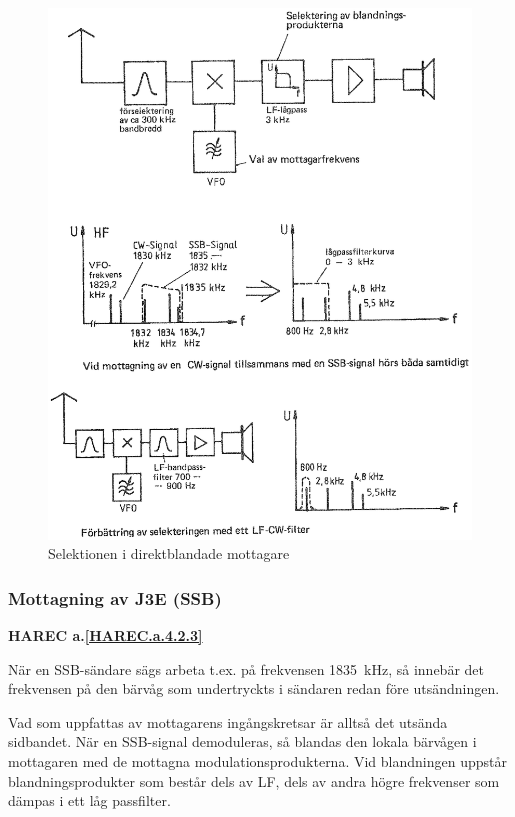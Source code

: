 \begin{figure}
  \includegraphics[width=\textwidth]{images/cropped_pdfs/bild_2_4-11.pdf}
  \caption{Selektionen i direktblandade mottagare}
  \label{fig:bildII4-11}
\end{figure}

\subsubsection{Mottagning av J3E (SSB)}
\textbf{HAREC a.\ref{HAREC.a.4.2.3}\label{myHAREC.a.4.2.3}}

När en SSB-sändare sägs arbeta t.ex. på frekvensen 1835~kHz, så
innebär det frekvensen på den bärvåg som undertryckts i sändaren redan
före utsändningen.

Vad som uppfattas av mottagarens ingångskretsar är alltså det utsända sidbandet.
När en SSB-signal demoduleras, så blandas den lokala bärvågen i mottagaren med
de mottagna modulationsprodukterna.
Vid blandningen uppstår blandningsprodukter som består dels av LF, dels av
andra högre frekvenser som dämpas i ett låg passfilter.

